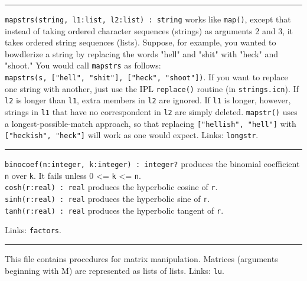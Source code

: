 \vspace{0.25cm}\hrule{}

\texttt{mapstrs(string, l1:list, l2:list) : string} works like
\texttt{map()}, except that instead of taking ordered character
sequences (strings) as arguments 2 and 3, it takes ordered string
sequences (lists). Suppose, for example, you wanted to
bowdlerize a string by replacing the words
"hell" and
"shit" with
"heck" and
"shoot." You would call \texttt{mapstrs} as
follows:\\
\texttt{mapstrs(s, ["hell",
"shit"],
["heck",
"shoot"])}. If you want to replace one
string with another, just use the IPL \texttt{replace()} routine (in
\texttt{strings.icn}). If \texttt{l2} is longer than \texttt{l1}, extra
members in \texttt{l2} are ignored. If \texttt{l1} is longer, however,
strings in \texttt{l1} that have no correspondent in \texttt{l2} are
simply deleted. \texttt{mapstr()} uses a longest-possible-match
approach, so that replacing
\texttt{["hellish",
"hell"]} with
\texttt{["heckish",
"heck"]} will work as one would expect.
Links: \texttt{longstr}.

\vspace{0.25cm}\hrule{}

\texttt{binocoef(n:integer, k:integer) : integer?} produces the
binomial coefficient \texttt{n} over
\texttt{k}. It fails unless 0 {\textless}= \texttt{k} {\textless}=
\texttt{n}.\\
\texttt{cosh(r:real) : real} produces the hyperbolic cosine of \texttt{r}.\\
\texttt{sinh(r:real) : real} produces the hyperbolic sine of
\texttt{r}.\\
\texttt{tanh(r:real) : real} produces the hyperbolic tangent of
\texttt{r}.

Links: \texttt{factors}.

\vspace{0.25cm}\hrule{}

This file contains procedures for matrix
manipulation. Matrices (arguments beginning with M) are represented as
lists of lists. Links: \texttt{lu}.

